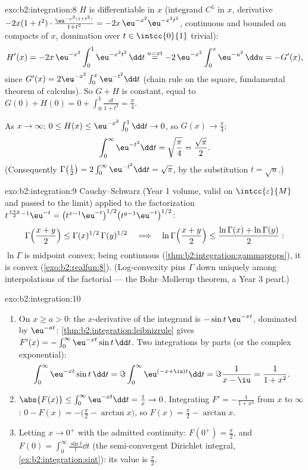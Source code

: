\begin{solution}{exo:b2:integration:8}
$H$ is differentiable in $x$ (integrand $C^1$ in $x$, derivative
$-2x(1+t^2)\cdot\frac{\eu^{-x^2(1+t^2)}}{1+t^2} =
-2x\,\eu^{-x^2}\eu^{-x^2t^2}$, continuous and bounded on compacts
of $x$, domination over $t \in \intcc{0}{1}$ trivial):
\[
H'(x) = -2x\,\eu^{-x^2}\int_0^1 \eu^{-x^2t^2}\,\dd t
\overset{u = xt}{=} -2\,\eu^{-x^2}\int_0^x \eu^{-u^2}\,\dd u
= -G'(x),
\]
since $G'(x) = 2\eu^{-x^2}\int_0^x \eu^{-t^2}\dd t$ (chain rule on
the square, fundamental theorem of calculus). So $G + H$ is
constant, equal to $G(0) + H(0) = 0 + \int_0^1 \frac{\dd t}{1+t^2}
= \frac\pi4$.

As $x \to \infty$: $0 \leq H(x) \leq \eu^{-x^2}\int_0^1 \dd t \to
0$, so $G(x) \to \frac\pi4$:
\[
\int_0^\infty \eu^{-t^2}\dd t = \sqrt{\frac\pi4} =
\frac{\sqrt\pi}{2} .
\]
(Consequently $\Gamma\bigl(\frac12\bigr) = 2\int_0^\infty
\eu^{-t^2}\dd t = \sqrt\pi$, by the substitution $t = \sqrt u$.)
\end{solution}

\begin{solution}{exo:b2:integration:9}
Cauchy--Schwarz (Year 1 volume, valid on $\intcc{\varepsilon}{M}$
and passed to the limit) applied to the factorization
$t^{\frac{x+y}{2}-1}\eu^{-t} = \bigl(t^{x-1}\eu^{-t}\bigr)^{1/2}
\bigl(t^{y-1}\eu^{-t}\bigr)^{1/2}$:
\[
\Gamma\Bigl(\frac{x+y}{2}\Bigr) \leq
\Gamma(x)^{1/2}\,\Gamma(y)^{1/2}
\quad\Longrightarrow\quad
\ln\Gamma\Bigl(\frac{x+y}{2}\Bigr) \leq \frac{\ln\Gamma(x) +
\ln\Gamma(y)}{2} :
\]
$\ln\Gamma$ is midpoint convex; being continuous
(\cref{thm:b2:integration:gammaprops}), it is convex
(\cref{exo:b2:realfun:8}). (Log-convexity pins $\Gamma$ down
uniquely among interpolations of the factorial --- the
Bohr--Mollerup theorem, a Year 3 pearl.)
\end{solution}

\begin{solution}{exo:b2:integration:10}
\begin{enumerate}
  \item On $x \geq a > 0$: the $x$-derivative of the integrand is
        $-\sin t\,\eu^{-xt}$, dominated by $\eu^{-at}$:
        \cref{thm:b2:integration:leibnizrule} gives $F'(x) =
        -\int_0^\infty \eu^{-xt}\sin t\,\dd t$. Two integrations by
        parts (or the complex exponential):
        \[
        \int_0^\infty \eu^{-xt}\sin t\,\dd t
        = \Im \int_0^\infty \eu^{(-x+\iu)t}\dd t
        = \Im\frac{1}{x - \iu} = \frac{1}{1 + x^2} .
        \]
  \item $\abs{F(x)} \leq \int_0^\infty \eu^{-xt}\dd t = \frac1x \to
        0$. Integrating $F' = -\frac{1}{1+x^2}$ from $x$ to
        $\infty$: $0 - F(x) = -\bigl(\frac\pi2 - \arctan x\bigr)$,
        so $F(x) = \frac\pi2 - \arctan x$.
  \item Letting $x \to 0^+$ with the admitted continuity: $F(0^+) =
        \frac\pi2$, and $F(0) = \int_0^\infty \frac{\sin t}{t}\dd
        t$ (the semi-convergent Dirichlet integral,
        \cref{ex:b2:integration:sint}): its value is
        $\frac\pi2$.
\end{enumerate}
\end{solution}

